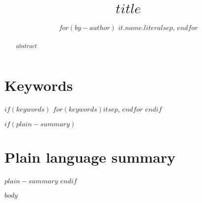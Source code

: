 \documentclass[10pt,a4paper]{article}
\begin{document}
\pagestyle{fancy}

\title{$title$}

\author[]{
$for(by-author)$
$it.name.literal$$sep$,
$endfor$}

\maketitle
\thispagestyle{fancy}

\begin{abstract}

$abstract$

\end{abstract}

\section*{\color{OREblue}Keywords}

$if(keywords)$
$for(keywords)$$it$$sep$, $endfor$
$endif$


\clearpage
\pagestyle{fancy}

$if(plain-summary)$
\section*{Plain language summary}

$plain-summary$
$endif$

\newcommand{\pandocbounded}[1]{#1}

$body$
\end{document}
